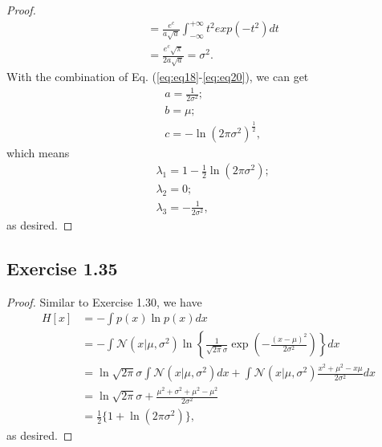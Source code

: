 \documentclass[11pt]{article}
\theoremstyle{definition}
\begin{document}
\begin{proof}
\begin{align}
&= \frac{e^c}{a\sqrt{a}}\int^{+\infty}_{-\infty}t^2exp(-t^2)dt \nonumber \\
&= \frac{e^c\sqrt{\pi}}{2a\sqrt{a}} = \sigma^2. \label{eq:eq20}
\end{align}
With the combination of Eq. (\ref{eq:eq18}-\ref{eq:eq20}), we can get
\begin{align*}
&a = \frac{1}{2\sigma^2}; \\
&b = \mu;\\
&c = -\ln(2\pi\sigma^2)^{\frac{1}{2}},
\end{align*}
which means
\begin{align*}
&\lambda_1 = 1-\frac{1}{2}\ln(2\pi\sigma^2); \\
&\lambda_2 = 0;\\
&\lambda_3 = -\frac{1}{2\sigma^2},
\end{align*}
as desired.
\end{proof}

\subsection{Exercise 1.35}
\begin{proof}
Similar to Exercise 1.30, we have
\begin{align*}
H[x] &= -\int p(x)\ln p(x) dx \\
&= -\int\mathcal{N}(x|\mu,\sigma^2)\ln\left\{\frac{1}{\sqrt{2\pi}\sigma}\exp\left(-\frac{(x-\mu)^2}{2\sigma^2}\right)\right\}dx \\
&= \ln {\sqrt{2\pi}\sigma} \int\mathcal{N}(x|\mu,\sigma^2)dx + \int\mathcal{N}(x|\mu,\sigma^2)\frac{x^2+\mu^2-x\mu}{2\sigma^2}dx \\
&= \ln {\sqrt{2\pi}\sigma} + \frac{\mu^2+\sigma^2+\mu^2-\mu^2}{2\sigma^2} \\
&= \frac{1}{2}\{1+\ln(2\pi \sigma^2)\},
\end{align*}
as desired. 
\end{proof}
\end{document}
